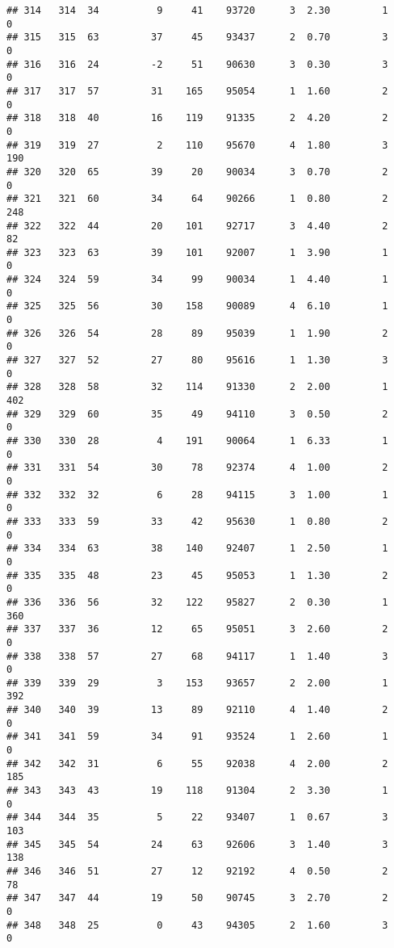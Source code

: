 \documentclass[
]{article}
\begin{document}
\begin{verbatim}
## 314   314  34          9     41    93720      3  2.30         1        0
## 315   315  63         37     45    93437      2  0.70         3        0
## 316   316  24         -2     51    90630      3  0.30         3        0
## 317   317  57         31    165    95054      1  1.60         2        0
## 318   318  40         16    119    91335      2  4.20         2        0
## 319   319  27          2    110    95670      4  1.80         3      190
## 320   320  65         39     20    90034      3  0.70         2        0
## 321   321  60         34     64    90266      1  0.80         2      248
## 322   322  44         20    101    92717      3  4.40         2       82
## 323   323  63         39    101    92007      1  3.90         1        0
## 324   324  59         34     99    90034      1  4.40         1        0
## 325   325  56         30    158    90089      4  6.10         1        0
## 326   326  54         28     89    95039      1  1.90         2        0
## 327   327  52         27     80    95616      1  1.30         3        0
## 328   328  58         32    114    91330      2  2.00         1      402
## 329   329  60         35     49    94110      3  0.50         2        0
## 330   330  28          4    191    90064      1  6.33         1        0
## 331   331  54         30     78    92374      4  1.00         2        0
## 332   332  32          6     28    94115      3  1.00         1        0
## 333   333  59         33     42    95630      1  0.80         2        0
## 334   334  63         38    140    92407      1  2.50         1        0
## 335   335  48         23     45    95053      1  1.30         2        0
## 336   336  56         32    122    95827      2  0.30         1      360
## 337   337  36         12     65    95051      3  2.60         2        0
## 338   338  57         27     68    94117      1  1.40         3        0
## 339   339  29          3    153    93657      2  2.00         1      392
## 340   340  39         13     89    92110      4  1.40         2        0
## 341   341  59         34     91    93524      1  2.60         1        0
## 342   342  31          6     55    92038      4  2.00         2      185
## 343   343  43         19    118    91304      2  3.30         1        0
## 344   344  35          5     22    93407      1  0.67         3      103
## 345   345  54         24     63    92606      3  1.40         3      138
## 346   346  51         27     12    92192      4  0.50         2       78
## 347   347  44         19     50    90745      3  2.70         2        0
## 348   348  25          0     43    94305      2  1.60         3        0

\end{verbatim}
\end{document}
